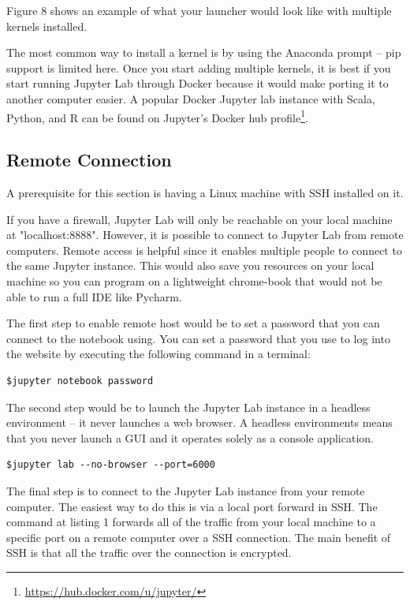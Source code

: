 \documentclass[pdftex,12pt]{artikel3}
\begin{document}
Figure 8 shows an example of what your launcher would look like with multiple kernels installed.

The most common way to install a kernel is by using the Anaconda prompt -- pip support is limited here.
Once you start adding multiple kernels, it is best if you start running Jupyter Lab through Docker because it would make porting it to another computer easier. A popular Docker Jupyter lab instance with Scala, Python, and R can be found on Jupyter's Docker hub profile\footnote{\url{https://hub.docker.com/u/jupyter/}}.

\subsection{Remote Connection}

A prerequisite for this section is having a Linux machine with SSH installed on it. 

If you have a firewall, Jupyter Lab will only be reachable on your local machine at \mbox{"localhost:8888"}. 
However, it is possible to connect to Jupyter Lab from remote computers. 
Remote access is helpful since it enables multiple people to connect to the same Jupyter instance. This would also save you resources on your local machine so you can program on a lightweight chrome-book that would not be able to run a full IDE like Pycharm.

The first step to enable remote host would be to set a password that you can connect to the notebook using. You can set a password that you use to log into the website by executing the following command in a terminal:

\begin{lstlisting}
$jupyter notebook password
\end{lstlisting}

The second step would be to launch the Jupyter Lab instance in a headless environment -- it never launches a web browser. 
A headless environments means that you never launch a GUI and it operates solely as a console application. 

\begin{lstlisting}
$jupyter lab --no-browser --port=6000
\end{lstlisting}

The final step is to connect to the Jupyter Lab instance from your
remote computer.
The easiest way to do this is via a local port forward in SSH. 
The command at listing 1 forwards all of the traffic from your local machine to a specific port on a remote computer over a SSH connection.
The main benefit of SSH is that all the traffic over the connection is encrypted.
\end{document}
